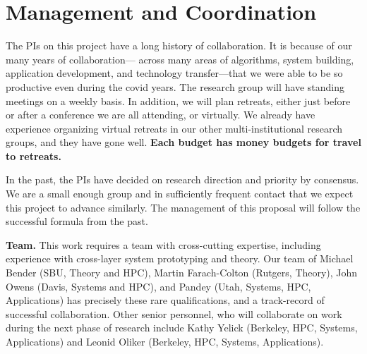 \section*{Management and Coordination}


The PIs on this project have a long history of collaboration. It is because of our many years of collaboration— across many areas of algorithms, system building, application development, and technology transfer—that we were able to be so productive even during the covid years.
%
The research group will have standing meetings on a weekly basis.  In addition, we will plan retreats, either just before or after a conference we are all attending, or virtually.  We already have experience organizing virtual retreats in our other multi-institutional research groups, and they have gone well. {\bf Each budget has money budgets for travel to retreats.}

In the past, the PIs have decided on research direction and priority by consensus. We are a small enough group and in sufficiently frequent contact that we expect this project to advance similarly. The management of this proposal will follow the successful formula from the past.

\noindent
{\bf Team.}
This work requires a team with cross-cutting expertise, including experience with cross-layer system prototyping and theory. Our team of Michael Bender (SBU, Theory and HPC), Martin Farach-Colton (Rutgers, Theory), John Owens (Davis, Systems and HPC), and Pandey (Utah, Systems, HPC, Applications) has precisely these rare qualifications, and a track-record of successful collaboration.
%
Other senior personnel, who will collaborate on work during the next phase of research include Kathy Yelick (Berkeley, HPC, Systems, Applications) and Leonid Oliker (Berkeley, HPC, Systems, Applications).

